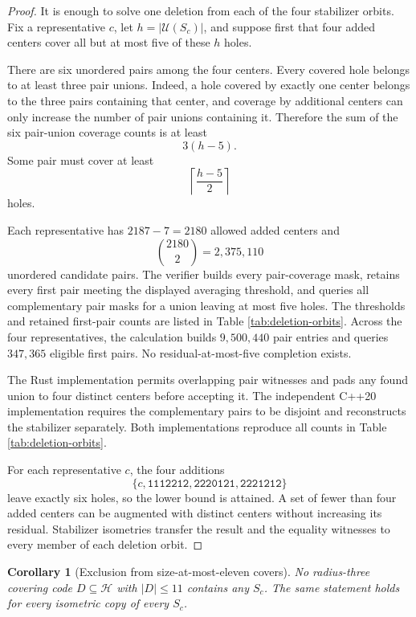 \documentclass[11pt]{article}
\newtheorem{corollary}[theorem]{Corollary}
\newcommand{\Hspace}{\mathcal{H}}
\newcommand{\Uncov}{\mathcal{U}}
\newcommand{\codeword}[1]{\texttt{#1}}
\begin{document}
\begin{proof}
It is enough to solve one deletion from each of the four stabilizer orbits.
Fix a representative \(c\), let \(h=|\Uncov(S_c)|\), and suppose first that
four added centers cover all but at most five of these \(h\) holes.

There are six unordered pairs among the four centers.  Every covered hole
belongs to at least three pair unions.  Indeed, a hole covered by exactly
one center belongs to the three pairs containing that center, and coverage
by additional centers can only increase the number of pair unions
containing it.  Therefore the sum of the six pair-union coverage counts is
at least
\[
  3(h-5).
\]
Some pair must cover at least
\[
  \left\lceil\frac{h-5}{2}\right\rceil
\]
holes.

Each representative has \(2187-7=2180\) allowed added centers and
\[
  \binom{2180}{2}=2{,}375{,}110
\]
unordered candidate pairs.  The verifier builds every pair-coverage mask,
retains every first pair meeting the displayed averaging threshold, and
queries all complementary pair masks for a union leaving at most five
holes.  The thresholds and retained first-pair counts are listed in Table
\ref{tab:deletion-orbits}.  Across the four representatives, the
calculation builds \(9{,}500{,}440\) pair entries and queries \(347{,}365\)
eligible first pairs.  No residual-at-most-five completion exists.

The Rust implementation permits overlapping pair witnesses and pads any
found union to four distinct centers before accepting it.  The independent
C++20 implementation requires the complementary pairs to be disjoint and
reconstructs the stabilizer separately.  Both implementations reproduce
all counts in Table \ref{tab:deletion-orbits}.

For each representative \(c\), the four additions
\[
  \{c,\codeword{1112212},\codeword{2220121},\codeword{2221212}\}
\]
leave exactly six holes, so the lower bound is attained.  A set of fewer
than four added centers can be augmented with distinct centers without
increasing its residual.  Stabilizer isometries transfer the result and
the equality witnesses to every member of each deletion orbit.
\end{proof}

\begin{corollary}[Exclusion from size-at-most-eleven covers]
\label{cor:seven-exclusion}
No radius-three covering code \(D\subseteq\Hspace\) with \(|D|\leq 11\)
contains any \(S_c\).  The same statement holds for every isometric copy of
every \(S_c\).
\end{corollary}
\end{document}
